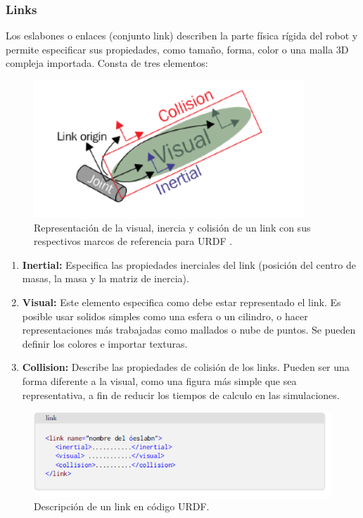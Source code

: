                                 \newpage

        
        \subsubsection{Links}
        
        Los eslabones o enlaces (conjunto link) describen la parte física rígida del robot y permite especificar sus propiedades, como tamaño, forma, color o una malla 3D compleja importada. Consta de tres elementos:
    
        \begin{figure}[htb]
            \centering
            \includegraphics[width=0.8\linewidth]{Main/Chapter3/Images3/3-7/eslabon2.png}
            \caption{Representación de la visual, inercia y colisión de un link con sus respectivos marcos de referencia para URDF  \cite{urdftutorials}.}
            \label{f:Cap3-7_noseee_urdf}
        \end{figure} 

        \begin{enumerate}
            \item \textbf{Inertial:} Especifica las propiedades inerciales del link (posición del centro de masas, la masa y la matriz de inercia).
            \item \textbf{Visual:} Este elemento especifica como debe estar representado el link. Es posible usar solidos simples como una esfera o un cilindro, o hacer representaciones más trabajadas como mallados o nube de puntos. Se pueden definir los colores e importar texturas.
            \item \textbf{Collision:} Describe las propiedades de colisión de los links. Pueden ser una forma diferente a la visual, como una figura más simple que sea representativa, a fin de reducir los tiempos de calculo en las simulaciones.
        \end{enumerate}
        
        \begin{figure}[htb]
            \centering
            \includegraphics[width=0.9\linewidth]{Main/Chapter3/Images3/3-7/codigo.png}
            \caption{Descripción de un link en código URDF.}
            \label{f:Cap3-7_nose_nose}
        \end{figure} 
        
